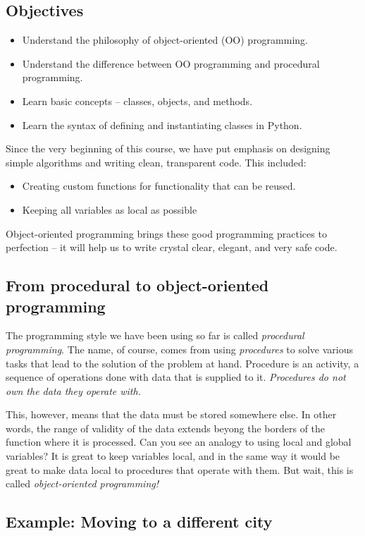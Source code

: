 \documentclass[article,A4,12pt]{llncs}
\begin{document}
\subsection{Objectives}

\begin{itemize}
\item Understand the philosophy of object-oriented (OO) programming.
\item Understand the difference between OO programming and procedural programming.
\item Learn basic concepts -- classes, objects, and methods.
\item Learn the syntax of defining and instantiating classes in Python.
\end{itemize}
Since the very beginning of this course, 
we have put emphasis on designing simple algorithms
and writing clean, transparent code. This included:
\begin{itemize}
\item Creating custom functions for functionality that can be reused.
\item Keeping all variables as local as possible
\end{itemize}
Object-oriented programming brings these good programming practices to
perfection -- it will help us to write crystal clear, elegant, and very safe code.

\subsection{From procedural to object-oriented programming}

The programming style we have been using so far is called {\em procedural programming}.
The name, of course, comes from using {\em procedures} to solve various tasks that 
lead to the solution of the problem at hand. Procedure is an activity, a sequence of operations 
done with data that is supplied to it. {\em Procedures do not own the data they 
operate with.} 

This, however, means that the data must be stored somewhere else. In other
words, the range of validity of the data extends beyong the borders of the 
function where it is processed. 
Can you see an analogy to using local and global variables? It is great
to keep variables local, and in the same way it would be great to make
data local to procedures that operate with them. But wait, this is called {\em 
object-oriented programming!}

\subsection{Example: Moving to a different city}
\end{document}
